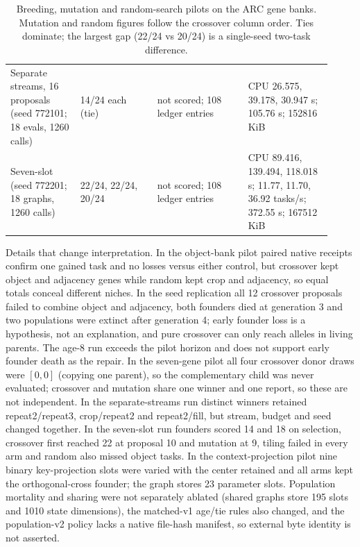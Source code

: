\documentclass[11pt]{article}
\begin{document}
\begin{table}[!htbp]
\begin{tabular}{@{}p{0.20\linewidth}p{0.22\linewidth}p{0.26\linewidth}p{0.24\linewidth}@{}}
Separate streams, 16 proposals (seed 772101; 18 evals, 1260 calls) & 14/24 each (tie) & not scored; 108 ledger entries & CPU 26.575, 39.178, 30.947 s; 105.76 s; 152816 KiB\\
Seven-slot (seed 772201; 18 graphs, 1260 calls) & 22/24, 22/24, 20/24 & not scored; 108 ledger entries & CPU 89.416, 139.494, 118.018 s; 11.77, 11.70, 36.92 tasks/s; 372.55 s; 167512 KiB\\
\bottomrule
\end{tabular}
\caption{Breeding, mutation and random-search pilots on the ARC gene banks. Mutation and
random figures follow the crossover column order. Ties dominate; the largest gap (22/24 vs 20/24)
is a single-seed two-task difference.}
\label{tab:pop}
\end{table}
Details that change interpretation. In the object-bank pilot paired native receipts confirm one
gained task and no losses versus either control, but crossover kept object and adjacency genes while
random kept crop and adjacency, so equal totals conceal different niches. In the seed replication all
12 crossover proposals failed to combine object and adjacency, both founders died at generation 3
and two populations were extinct after generation 4; early founder loss is a hypothesis, not an
explanation, and pure crossover can only reach alleles in living parents. The age-8 run exceeds the
pilot horizon and does not support early founder death as the repair. In the seven-gene pilot all
four crossover donor draws were $[0,0]$ (copying one parent), so the complementary child was never
evaluated; crossover and mutation share one winner and one report, so these are not independent.
In the separate-streams run distinct winners retained repeat2/repeat3, crop/repeat2 and
repeat2/fill, but stream, budget and seed changed together. In the seven-slot run founders scored 14 and
18 on selection, crossover first reached 22 at proposal 10 and mutation at 9, tiling failed in every
arm and random also missed object tasks. In the context-projection pilot nine binary key-projection
slots were varied with the center retained and all arms kept the orthogonal-cross founder; the
graph stores 23 parameter slots. Population mortality and sharing were not separately ablated
(shared graphs store 195 slots and 1010 state dimensions), the matched-v1 age/tie rules also changed,
and the population-v2 policy lacks a native file-hash manifest, so external byte identity is not
asserted.
\end{document}
